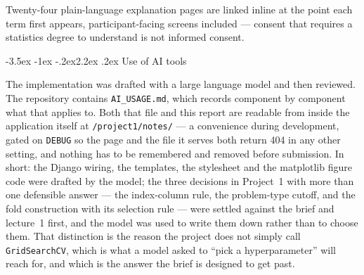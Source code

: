 \documentclass[11pt,a4paper]{article}
\makeatletter
\renewcommand\section{\@startsection{section}{1}{\z@}%
  {-3.5ex \@plus -1ex \@minus -.2ex}{2.2ex \@plus.2ex}%
  {\normalfont\Large\sffamily\bfseries\color{accent}}}
\newcommand{\file}[1]{\texttt{\small #1}}
\makeatother
\begin{document}
Twenty-four plain-language explanation pages are linked inline at the point each
term first appears, participant-facing screens included --- consent that requires
a statistics degree to understand is not informed consent.

\section{Use of AI tools}

The implementation was drafted with a large language model and then reviewed. The
repository contains \file{AI\_USAGE.md}, which records component by component what
that applies to. Both that file and this report are readable from inside the
application itself at \file{/project1/notes/} --- a convenience during
development, gated on \texttt{DEBUG} so the page and the file it serves both
return 404 in any other setting, and nothing has to be remembered and removed
before submission. In short: the Django wiring, the templates, the stylesheet and
the matplotlib figure code were drafted by the model; the three decisions in
Project~1 with more than one defensible answer --- the index-column rule, the
problem-type cutoff, and the fold construction with its selection rule --- were
settled against the brief and lecture~1 first, and the model was used to write
them down rather than to choose them. That distinction is the reason the project
does not simply call \texttt{GridSearchCV}, which is what a model asked to ``pick a
hyperparameter'' will reach for, and which is the answer the brief is designed to
get past.
\end{document}
